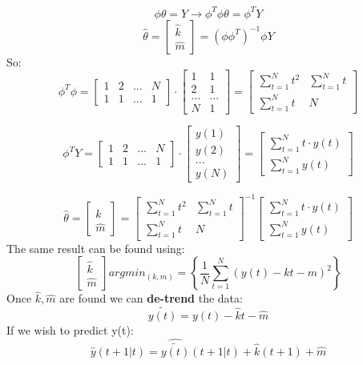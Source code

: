 $$ \phi \theta = Y \to \phi^T\phi\theta = \phi^TY$$
\[
\boxed{\hat{\theta} = \begin{bmatrix} \hat{k} \\ \hat{m} \end{bmatrix} = (\phi\phi^T)^{-1}\phi Y}
\]
So:
$$ \phi^T\phi =
 \begin{bmatrix} 1 & 2 & ... & N \\ 1 & 1 & ... & 1 \end{bmatrix} \cdot
  \begin{bmatrix} 1 & 1 \\ 2 & 1 \\ ... & ...\\ N & 1 \end{bmatrix} = 	   	 
  \begin{bmatrix} \sum\limits_{t=1}^{N}t^2 &  \sum\limits_{t=1}^{N}t \\ \sum\limits_{t=1}^{N}t & N \end{bmatrix}$$

$$ \phi^TY =
 \begin{bmatrix} 1 & 2 & ... & N \\ 1 & 1 & ... & 1 \end{bmatrix} \cdot
  \begin{bmatrix} y(1) \\ y(2) \\ ... \\ y(N) \end{bmatrix} = 	   	 
  \begin{bmatrix} \sum\limits_{t=1}^{N}t \cdot y(t)\\ \sum\limits_{t=1}^{N}y(t) \end{bmatrix}$$
  
\[
\boxed{\hat{\theta} = \begin{bmatrix} \hat{k} \\ \hat{m} \end{bmatrix} =\begin{bmatrix} \sum\limits_{t=1}^{N}t^2 &  \sum\limits_{t=1}^{N}t \\ \sum\limits_{t=1}^{N}t & N \end{bmatrix}^{-1} \begin{bmatrix} \sum\limits_{t=1}^{N}t \cdot y(t)\\ \sum\limits_{t=1}^{N}y(t) \end{bmatrix}}
\]
The same result can be found using:
$$\begin{bmatrix} \hat{k} \\ \hat{m} \end{bmatrix} argmin_{(k,m)}=\left\{ \frac{1}{N} \sum\limits_{t=1}^{N}(y(t) - kt-m)^2 \right\}  $$
Once $\hat{k} ,\hat{m}$ are found we can \textbf{de-trend} the data:
\[
\boxed{\tilde{y(t)} = y(t) - \hat{k}t-\hat{m}}
\]
If we wish to predict y(t):
$$\hat{y}(t+1|t)=\hat{\tilde{y(t)}}(t+1|t) + \hat{k}(t+1)+\hat{m}$$

